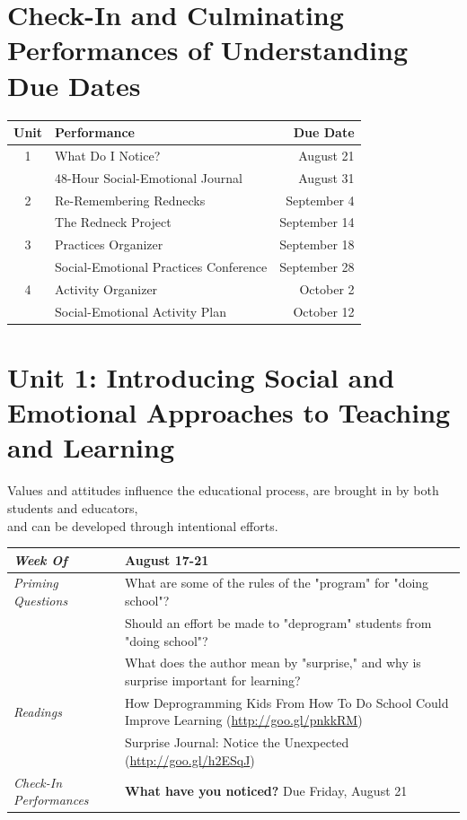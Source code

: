 \documentclass{tufte-handout}
\newcommand{\gentopic}[1]{\begin{fullwidth}\begin{center}\faKey \textsf{#1}\end{center}\end{fullwidth}}
\newcommand{\tabpq}{\faQuestionSign\medspace\textit{Priming Questions}}
\newcommand{\tabread}{\faBook\medspace\textit{Readings}}
\newcommand{\tabdt}{\faCalendar\medspace\textit{Week Of}}
\newcommand{\tabcheckin}{\faPagelines\medspace\textit{Check-In Performances}}
\newenvironment{tabsched}
	{\small
	\begin{tabular}{p{1.5in}p{4.5in}}
	\midrule}
	{\midrule
	\end{tabular}
	\normalsize}
\newcommand{\weekone}{August 17-21}
\begin{document}
\medskip

\section{Check-In and Culminating Performances of Understanding Due Dates}
\begin{tabular}{clr}
	\toprule
	Unit & Performance & Due Date \\
	\midrule\midrule
	1 & What Do I Notice? & August 21 \\
	& 48-Hour Social-Emotional Journal & August 31 \\
	\midrule
	2 & Re-Remembering Rednecks & September 4 \\
	& The Redneck Project & September 14 \\
	\midrule
	3 & Practices Organizer & September 18 \\
	& Social-Emotional Practices Conference & September 28 \\
	\midrule
	4 & Activity Organizer & October 2 \\
	& Social-Emotional Activity Plan & October 12 \\
	\bottomrule
\end{tabular}

	\section{Unit 1: Introducing Social and Emotional Approaches to Teaching and Learning}

\gentopic{Values and attitudes influence the educational process, are brought in by both students and educators,\\and can be developed through intentional efforts.}


\begin{tabsched}
	\tabdt & \weekone \\
	\midrule
	\tabpq & What are some of the rules of the "program" for "doing school"? \\
	& Should an effort be made to "deprogram" students from "doing school"? \\
	& What does the author mean by "surprise," and why is surprise important for learning? \\
	\midrule
	\tabread & How Deprogramming Kids From How To Do School Could Improve Learning (\url{http://goo.gl/pnkkRM}) \\
	& Surprise Journal: Notice the Unexpected (\url{http://goo.gl/h2ESqJ}) \\
	\midrule
	\tabcheckin & \textbf{What have you noticed?} Due Friday, August 21 \\
\end{tabsched}
\end{document}
